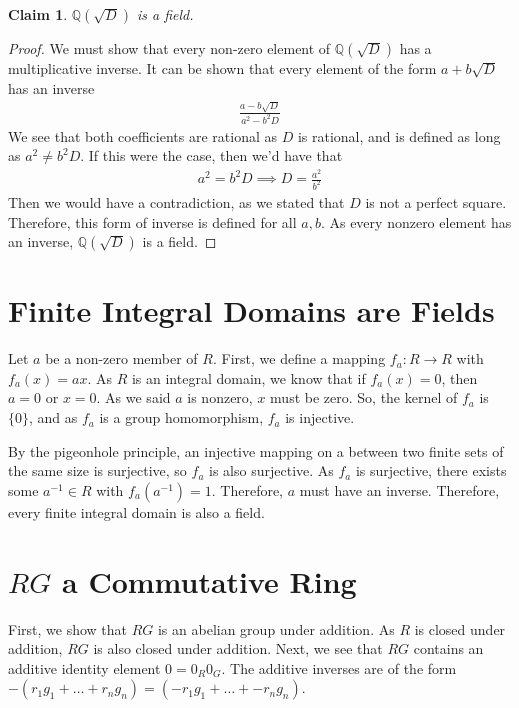 \documentclass[12pt]{article}
\newtheorem*{claim*}{Claim}
\newcommand*{\inv}{^{-1}}
\begin{document}
\begin{claim*}
$\mathbb{Q}(\sqrt{D})$ is a field.
\end{claim*}
\begin{proof}
We must show that every non-zero element of $\mathbb{Q}(\sqrt{D})$ has a multiplicative inverse. It can be shown that every element of the form $a + b\sqrt{D}$ has an inverse
\begin{align*}
\frac{a - b\sqrt{D}}{a^2 -b^2D}
\end{align*}
We see that both coefficients are rational as $D$ is rational, and is defined as long as $a^2 \neq b^2D$. If this were the case, then we'd have  that
\begin{align*}
a^2 = b^2D \implies D = \frac{a^2}{b^2}
\end{align*}
Then we would have a contradiction, as we stated that $D$ is not a perfect square. Therefore, this form of inverse is defined for all $a, b$. As every nonzero element has an inverse, $\mathbb{Q}(\sqrt{D})$ is a field.
\end{proof}

\section{Finite Integral Domains are Fields}
Let $a$ be a non-zero member of $R$. First, we define a mapping $f_a : R \rightarrow R$ with $f_a(x) = ax$. As $R$ is an integral domain, we know that if $f_a(x) = 0$, then $a = 0$ or $x = 0$. As we said $a$ is nonzero, $x$ must be zero. So, the kernel of $f_a$ is $\{0\}$, and as $f_a$ is a group homomorphism, $f_a$ is injective.

By the pigeonhole principle, an injective mapping on a between two finite sets of the same size is surjective, so $f_a$ is also surjective. As $f_a$ is surjective, there exists some $a\inv \in R$ with $f_a(a\inv) = 1$. Therefore, $a$ must have an inverse. Therefore, every finite integral domain is also a field. 
\section{$RG$ a Commutative Ring}
First, we show that $RG$ is an abelian group under addition. As $R$ is closed under addition, $RG$ is also closed under addition. Next, we see that $RG$ contains an additive identity element $0 = 0_R0_G$. The additive inverses are of the form
$-(r_1g_1 + \ldots + r_ng_n) = (-r_1g_1 + \ldots + -r_ng_n)$.
\end{document}
